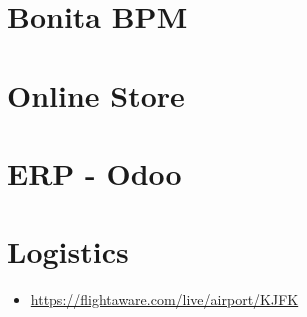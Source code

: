\documentclass[]{book}
\providecommand{\tightlist}{%
  \setlength{\itemsep}{0pt}\setlength{\parskip}{0pt}}
\begin{document}
\hypertarget{bonita-bpm}{%
\section{Bonita BPM}\label{bonita-bpm}}

\hypertarget{online-store-1}{%
\section{Online Store}\label{online-store-1}}

\hypertarget{erp---odoo}{%
\section{ERP - Odoo}\label{erp---odoo}}

\hypertarget{logistics-1}{%
\section{Logistics}\label{logistics-1}}

\begin{itemize}
\tightlist
\item
  \url{https://flightaware.com/live/airport/KJFK}
\end{itemize}


\end{document}
